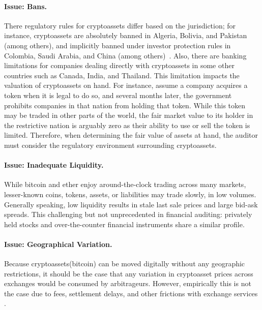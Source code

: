 \paragraph{Issue: Bans.} There regulatory rules for cryptoassets differ based on the jurisdiction; for instance, cryptoassets are absolutely banned in Algeria, Bolivia, and Pakistan (among others), and implicitly banned under investor protection rules in Colombia, Saudi Arabia, and China (among others)~\cite{cryptoLegalityWiki}. Also, there are banking limitations for companies dealing directly with cryptoassets in some other countries such as Canada, India, and Thailand. This limitation impacts the valuation of cryptoassets on hand. For instance, assume a company acquires a token when it is legal to do so, and several months later, the government prohibits companies in that nation from holding that token. While this token may be traded in other parts of the world, the fair market value to its holder in the restrictive nation is arguably zero as their ability to use or sell the token is limited. Therefore, when determining the fair value of assets at hand, the auditor must consider the regulatory environment surrounding cryptoassets. 

\paragraph{Issue: Inadequate Liquidity.} While bitcoin and ether enjoy around-the-clock trading across many markets, lesser-known coins, tokens, assets, or liabilities may trade slowly, in low volumes. Generally speaking, low liquidity results in stale last sale prices and large bid-ask spreads. This challenging but not unprecedented in financial auditing: privately held stocks and over-the-counter financial instruments share a similar profile.

\paragraph{Issue: Geographical Variation.} Because cryptoassets(\eg bitcoin) can be moved digitally without any geographic restrictions, it should be the case that any variation in cryptoasset prices across exchanges would be consumed by arbitrageurs. However, empirically this is not the case due to fees, settlement delays, and other frictions with exchange services \todo{[cite]}.

